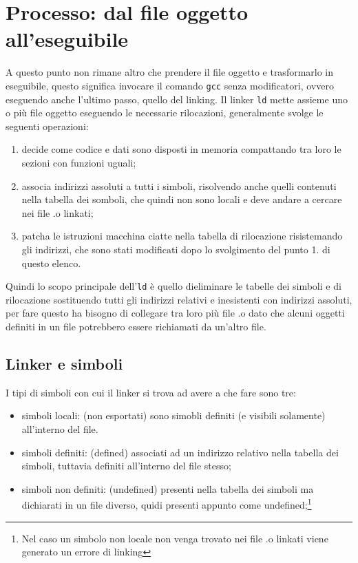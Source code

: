 \documentclass[class=book, crop=false, oneside]{standalone}
\begin{document}
\section{Processo: dal file oggetto all'eseguibile}
A questo punto non rimane altro che prendere il file oggetto e trasformarlo in eseguibile, questo significa invocare il comando \texttt{gcc} senza modificatori, ovvero eseguendo anche l'ultimo passo, quello del linking.
Il linker \texttt{ld} mette assieme uno o più file oggetto eseguendo le necessarie rilocazioni, generalmente svolge le seguenti operazioni:
\begin{enumerate}
	\item decide come codice e dati sono disposti in memoria compattando tra loro le sezioni con funzioni uguali;
	\item associa indirizzi assoluti a tutti i simboli, risolvendo anche quelli contenuti nella tabella dei somboli, che quindi non sono locali e deve andare a cercare nei file .o linkati;
	\item patcha le istruzioni macchina ciatte nella tabella di rilocazione risistemando gli indirizzi, che sono stati modificati dopo lo svolgimento del punto 1. di questo elenco.
\end{enumerate}

Quindi lo scopo principale dell'\texttt{ld} è quello dieliminare le tabelle dei simboli e di rilocazione sostituendo tutti gli indirizzi relativi e inesistenti con indirizzi assoluti, per fare questo ha bisogno di collegare tra loro più file .o dato che alcuni oggetti definiti in un file potrebbero essere richiamati da un'altro file.

\subsection{Linker e simboli}
I tipi di simboli con cui il linker si trova ad avere a che fare sono tre:
\begin{itemize}
	\item simboli locali: (non esportati) sono simobli definiti (e visibili solamente) all'interno del file.
	\item simboli definiti: (defined) associati ad un indirizzo relativo nella tabella dei simboli, tuttavia definiti all'interno del file stesso;
	\item simboli non definiti: (undefined) presenti nella tabella dei simboli ma dichiarati in un file diverso, quidi presenti appunto come undefined;\footnote{Nel caso un simbolo non locale non venga trovato nei file .o linkati viene generato un errore di linking}
\end{itemize}
\end{document}
